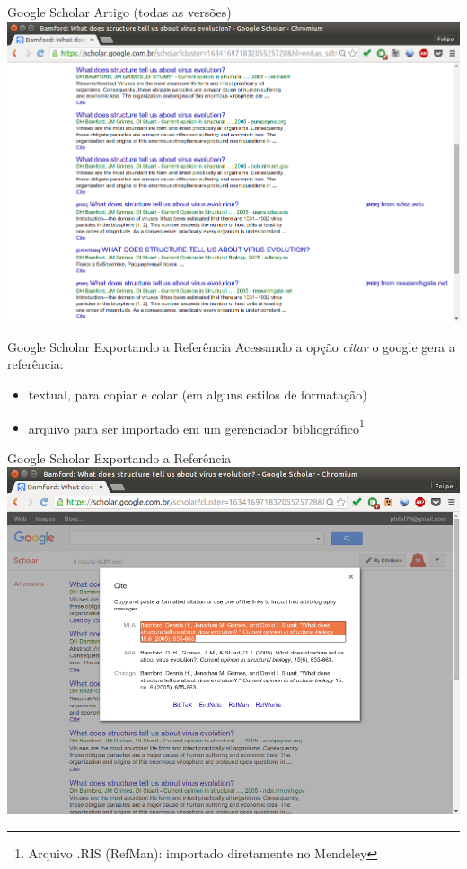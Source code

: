\documentclass{beamer}
\begin{document}
\begin{frame}{Google Scholar Artigo (todas as versões)}
  \includegraphics[height=.85\textheight]{Busca/scholar-paper}
\end{frame}

\begin{frame}{Google Scholar Exportando a Referência}
  Acessando a opção {\em citar} o google gera a referência:
  \begin{itemize}
  \item textual, para copiar e colar (em alguns estilos de formatação)
  \item arquivo para ser importado em um gerenciador
    bibliográfico\footnote{Arquivo .RIS (RefMan): importado
      diretamente no Mendeley}
  \end{itemize}
\end{frame}

\begin{frame}{Google Scholar Exportando a Referência}
  \includegraphics[height=.85\textheight]{Busca/scholar-export}
\end{frame}
\end{document}
